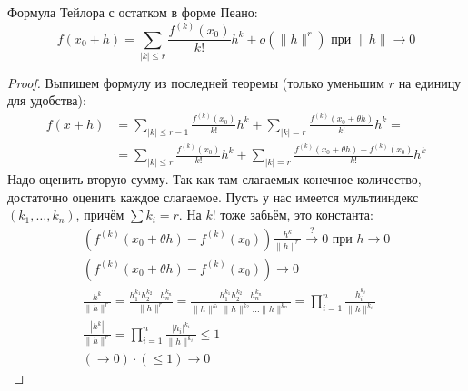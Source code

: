 \begin{theorem}
	Формула Тейлора с остатком в форме Пеано:
	\[ f(x_0+h) = \sum_{|k|\le r} \frac{f^{(k)}(x_0)}{k!} h^k + o(\|h\|^r) \text{~при~} \|h\| \to 0\]
\end{theorem}
\begin{proof}
	Выпишем формулу из последней теоремы (только уменьшим $r$ на единицу для удобства):
	\begin{align*}
		f(x+h) &= \sum_{|k|\le r-1} \frac{f^{(k)}(x_0)}{k!} h^k + \sum_{|k|=r}\frac{f^{(k)}(x_0+\theta h)}{k!}h^k = \\
		       &= \sum_{|k|\le r  } \frac{f^{(k)}(x_0)}{k!} h^k + \sum_{|k|=r}\frac{f^{(k)}(x_0+\theta h)-f^{(k)}(x_0)}{k!}h^k
	\end{align*}
	Надо оценить вторую сумму.
	Так как там слагаемых конечное количество, достаточно оценить каждое слагаемое.
	Пусть у нас имеется мультииндекс $(k_1, \dots, k_n)$, причём $\sum k_i = r$.
	На $k!$ тоже забьём, это константа:
	\begin{gather*}
		\left(f^{(k)}(x_0+\theta h) - f^{(k)} (x_0)\right) \frac{h^k}{\|h\|^r} \stackrel{?}{\to} 0 \text{~при~} h \to 0 \\
		\left(f^{(k)}(x_0+\theta h) - f^{(k)} (x_0)\right) \to 0 \\
		\frac{h^k}{\|h\|^r}
			= \frac{h_1^{k_1}h_2^{k_2}\dots h_n^{k_n}}{\|h\|^r}
			= \frac{h_1^{k_1}h_2^{k_2}\dots h_n^{k_n}}{\|h\|^{k_1}\|h\|^{k_2}\dots\|h\|^{k_n}}
			= \prod_{i=1}^{n} \frac{h_i^{k_i}}{\|h\|^{k_i}} \\
		\frac{|h^k|}{\|h\|^r}
			= \prod_{i=1}^{n} \frac{|h_i|^{k_i}}{\|h\|^{k_i}}
			\le 1 \\
		(\to 0) \cdot (\le 1) \to 0
	\end{gather*}
\end{proof}

